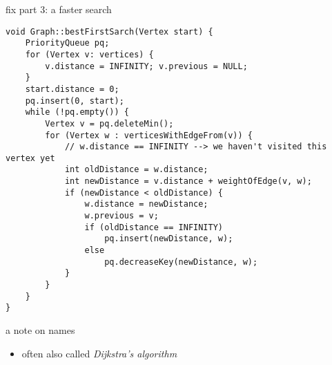 \begin{frame}[fragile,label=withPQ]{fix part 3: a faster search}
\begin{lstlisting}
void Graph::bestFirstSarch(Vertex start) {
    PriorityQueue pq;
    for (Vertex v: vertices) {
        v.distance = INFINITY; v.previous = NULL;
    }
    start.distance = 0;
    pq.insert(0, start);
    while (!pq.empty()) {
        Vertex v = pq.deleteMin();
        for (Vertex w : verticesWithEdgeFrom(v)) {
            // w.distance == INFINITY --> we haven't visited this vertex yet
            int oldDistance = w.distance;
            int newDistance = v.distance + weightOfEdge(v, w);
            if (newDistance < oldDistance) {
                w.distance = newDistance;
                w.previous = v;
                if (oldDistance == INFINITY)
                    pq.insert(newDistance, w);
                else
                    pq.decreaseKey(newDistance, w);
            } 
        }
    }
}
\end{lstlisting}
\end{frame}

\begin{frame}{a note on names}
\begin{itemize}
\item often also called \textit{Dijkstra's algorithm}
\end{itemize}
\end{frame}
